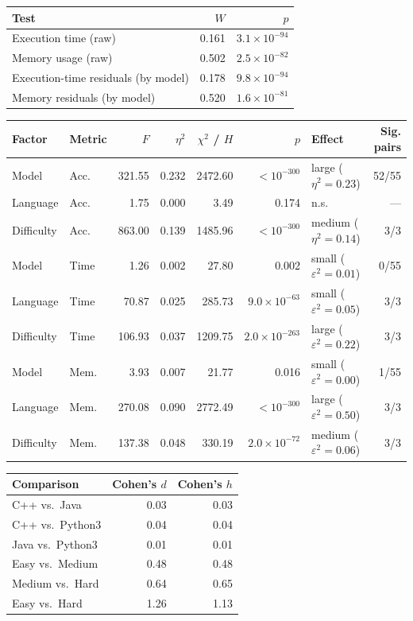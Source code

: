 \begin{tabular}{lrr}
\hline
\textbf{Test} & \textbf{$W$} & \textbf{$p$} \\
\hline
Execution time (raw) & 0.161 & $3.1\times10^{-94}$ \\
Memory usage (raw) & 0.502 & $2.5\times10^{-82}$ \\
Execution-time residuals (by model) & 0.178 & $9.8\times10^{-94}$ \\
Memory residuals (by model) & 0.520 & $1.6\times10^{-81}$ \\
\hline
\end{tabular}

\begin{tabular}{llrrrrlr}
\hline
\textbf{Factor} & \textbf{Metric} & \textbf{$F$} & \textbf{$\eta^{2}$} & \textbf{$\chi^2$ / $H$} & \textbf{$p$} & \textbf{Effect} & \textbf{Sig. pairs} \\
\hline
Model & Acc. & 321.55 & 0.232 & 2472.60 & $<10^{-300}$ & large ($\eta^{2}=0.23$) & 52/55 \\
Language & Acc. & 1.75 & 0.000 & 3.49 & 0.174 & n.s. & --- \\
Difficulty & Acc. & 863.00 & 0.139 & 1485.96 & $<10^{-300}$ & medium ($\eta^{2}=0.14$) & 3/3 \\
Model & Time & 1.26 & 0.002 & 27.80 & 0.002 & small ($\varepsilon^{2}=0.01$) & 0/55 \\
Language & Time & 70.87 & 0.025 & 285.73 & $9.0\times10^{-63}$ & small ($\varepsilon^{2}=0.05$) & 3/3 \\
Difficulty & Time & 106.93 & 0.037 & 1209.75 & $2.0\times10^{-263}$ & large ($\varepsilon^{2}=0.22$) & 3/3 \\
Model & Mem. & 3.93 & 0.007 & 21.77 & 0.016 & small ($\varepsilon^{2}=0.00$) & 1/55 \\
Language & Mem. & 270.08 & 0.090 & 2772.49 & $<10^{-300}$ & large ($\varepsilon^{2}=0.50$) & 3/3 \\
Difficulty & Mem. & 137.38 & 0.048 & 330.19 & $2.0\times10^{-72}$ & medium ($\varepsilon^{2}=0.06$) & 3/3 \\
\hline
\end{tabular}

\begin{tabular}{lrr}
\hline
\textbf{Comparison} & \textbf{Cohen's $d$} & \textbf{Cohen's $h$} \\
\hline
C++ vs.\ Java & 0.03 & 0.03 \\
C++ vs.\ Python3 & 0.04 & 0.04 \\
Java vs.\ Python3 & 0.01 & 0.01 \\
Easy vs.\ Medium & 0.48 & 0.48 \\
Medium vs.\ Hard & 0.64 & 0.65 \\
Easy vs.\ Hard & 1.26 & 1.13 \\
\hline
\end{tabular}

